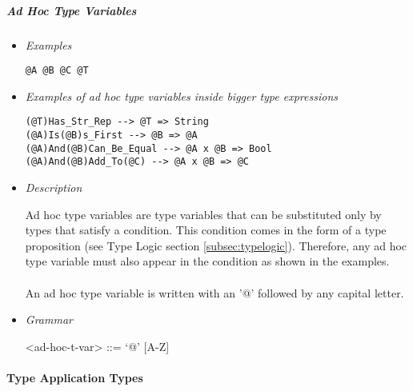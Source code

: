 \documentclass{article}
\begin{document}
\subparagraph{Ad Hoc Type Variables}

\begin{itemize}
\item \textit{Examples}
\begin{verbatim}
@A @B @C @T
\end{verbatim}

\item \textit{Examples of ad hoc type variables inside bigger type expressions}
\begin{verbatim}
(@T)Has_Str_Rep --> @T => String
(@A)Is(@B)s_First --> @B => @A
(@A)And(@B)Can_Be_Equal --> @A x @B => Bool
(@A)And(@B)Add_To(@C) --> @A x @B => @C
\end{verbatim}

\item \textit{Description}

Ad hoc type variables are type variables that can be substituted only by types
that satisfy a condition. This condition comes in the form of a type
proposition (see Type Logic section \ref{subsec:typelogic}). Therefore, any ad
hoc type variable must also appear in the condition as shown in the examples.
\\\\
An ad hoc type variable is written with an '@' followed by any capital letter.

\item \textit{Grammar}
\begin{grammar}
<ad-hoc-t-var> ::= `@' [A-Z]
\end{grammar}
\end{itemize}

\paragraph{Type Application Types}
\end{document}
